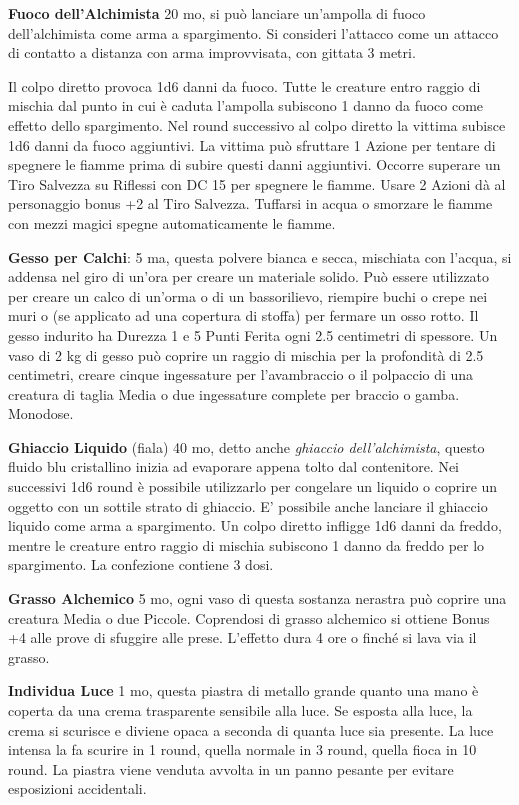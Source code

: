 \begin{multicols}{2}
\textbf{Fuoco dell'Alchimista}\hypertarget{Fuoco dell'Alchimista}{} 20 mo, si può lanciare un'ampolla di fuoco dell'alchimista come arma a spargimento. Si consideri l'attacco come un attacco di contatto a distanza con arma improvvisata, con gittata 3 metri.

Il colpo diretto provoca 1d6 danni da fuoco. Tutte le creature entro raggio di mischia dal punto in cui è caduta l'ampolla subiscono 1 danno da fuoco come effetto dello spargimento. Nel round successivo al colpo diretto la vittima subisce 1d6 danni da fuoco aggiuntivi. La vittima può sfruttare 1 Azione per tentare di spegnere le fiamme prima di subire questi danni aggiuntivi. Occorre superare un Tiro Salvezza su Riflessi con DC 15 per spegnere le fiamme. Usare 2 Azioni dà al personaggio bonus +2 al Tiro Salvezza. Tuffarsi in acqua o smorzare le fiamme con mezzi magici spegne automaticamente le fiamme.

\textbf{Gesso per Calchi}: 5 ma, questa polvere bianca e secca, mischiata con l'acqua, si addensa nel giro di un'ora per creare un materiale solido. Può essere utilizzato per creare un calco di un'orma o di un bassorilievo, riempire buchi o crepe nei muri o (se applicato ad una copertura di stoffa) per fermare un osso rotto. Il gesso indurito ha Durezza 1 e 5 Punti Ferita ogni 2.5 centimetri di spessore. Un vaso di 2 kg di gesso può coprire un raggio di mischia per la profondità di 2.5 centimetri, creare cinque ingessature per l'avambraccio o il polpaccio di una creatura di taglia Media o due ingessature complete per braccio o gamba. Monodose.

\textbf{Ghiaccio Liquido} (fiala) 40 mo, detto anche \emph{ghiaccio dell'alchimista}, questo fluido blu cristallino inizia ad evaporare appena tolto dal contenitore. Nei successivi 1d6 round è possibile utilizzarlo per congelare un liquido o coprire un oggetto con un sottile strato di ghiaccio. E' possibile anche lanciare il ghiaccio liquido come arma a spargimento. Un colpo diretto infligge 1d6 danni da freddo, mentre le creature entro raggio di mischia subiscono 1 danno da freddo per lo spargimento. La confezione contiene 3 dosi.

\textbf{Grasso Alchemico} 5 mo, ogni vaso di questa sostanza nerastra può coprire una creatura Media o due Piccole. Coprendosi di grasso alchemico si ottiene Bonus +4 alle prove di sfuggire alle prese. L'effetto dura 4 ore o finché si lava via il grasso.

\textbf{Individua Luce} 1 mo, questa piastra di metallo grande quanto una mano è coperta da una crema trasparente sensibile alla luce. Se esposta alla luce, la crema si scurisce e diviene opaca a seconda di quanta luce sia presente. La luce intensa la fa scurire in 1 round, quella normale in 3 round, quella fioca in 10 round.
La piastra viene venduta avvolta in un panno pesante per evitare esposizioni accidentali.


\end{multicols}
